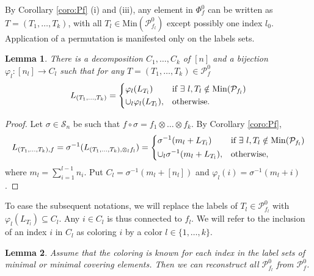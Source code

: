\documentclass[12pt]{article}
\newtheorem{lemma}{Lemma}
\theoremstyle{definition}
\theoremstyle{remark}
\def\Pe{\mathcal P}
\def\permut{\mathscr{S}}
\begin{document}
By Corollary \ref{coro:Pf} (i) and (iii), any element in $\Phi_f^0$ can be written as  $T=(T_1,\dots,T_k)$, with all $T_l\in
\mathrm{Min}(\Pe_{f_l}^0)$ except possibly one index $l_0$. Application of a 
permutation  is manifested only on the labels sets.


\begin{lemma}\label{lemma:colors} There
is a decomposition $C_1,\dots, C_k$ of $[n]$ and a
bijection $\varphi_l:[n_l]\to C_l$ such that for any $T=(T_1,\dots,T_k)\in
\Pe_f^0$
\[
L_{(T_1,\dots,T_k)}=\begin{dcases} \varphi_l(L_{T_l}) & 
\text{if } \exists \ l, T_l\notin \mathrm{Min}(\Pe_{f_l})\\
\cup_l \varphi_l(L_{T_l}), & \text{otherwise}.
\end{dcases}
\]



\end{lemma}

\begin{proof} 
Let $\sigma\in \permut_n$ be such that $f\circ\sigma=f_1\otimes \dots\otimes f_k$. 
By Corollary \ref{coro:Pf}, 
\[
L_{(T_1,\dots,T_k),f}=\sigma^{-1}(L_{(T_1,\dots,T_k),\otimes_l
f_l})=\begin{dcases}\sigma^{-1}(m_l+L_{T_l}) & 
\text{if } \exists \ l, T_l\notin \mathrm{Min}(\Pe_{f_l})\\
\cup_l \sigma^{-1}(m_l+L_{T_l}), & \text{otherwise},
\end{dcases}
\]
where $m_l=\sum_{i=1}^{l-1}n_i$. Put $C_l=\sigma^{-1}(m_l+[n_l])$ and
$\varphi_l(i)=\sigma^{-1}(m_l+i)$.

\end{proof}


To ease the subsequent notations, we will replace
the labels of $T_{l}\in \Pe_{f_{l}}^0$ with $\varphi_l(L_{T_l})\subseteq C_l$.
Any $i\in C_l$ is thus connected to $f_l$. We will refer to the inclusion of an index $i$ in $C_l$ as
coloring $i$ by a color $l\in\{1,\dots,k\}$.  


\begin{lemma}\label{lemma:color_min} Assume that the coloring is known for each index in
the label sets of minimal or minimal covering elements. Then we can reconstruct all
$\Pe_{f_l}^0$ from $\Pe_f^0$.

\end{lemma}
\end{document}
